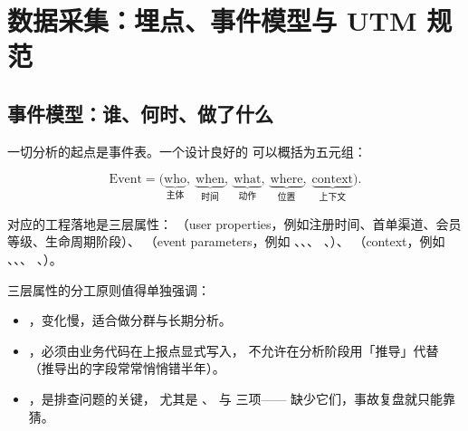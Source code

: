 \section{数据采集：埋点、事件模型与 UTM 规范}

\subsection{事件模型：谁、何时、做了什么}

一切分析的起点是事件表。一个设计良好的 可以概括为五元组：

\begin{equation}
\text{Event} = \big( \underbrace{\text{who}}_{\text{主体}}, \;
\underbrace{\text{when}}_{\text{时间}}, \;
\underbrace{\text{what}}_{\text{动作}}, \;
\underbrace{\text{where}}_{\text{位置}}, \;
\underbrace{\text{context}}_{\text{上下文}} \big).
\label{eq:growth-event-model}
\end{equation}

对应的工程落地是三层属性：
（user properties，例如注册时间、首单渠道、会员等级、生命周期阶段）、
（event parameters，例如 、、、
、）、
（context，例如 、、、
、）。

三层属性的分工原则值得单独强调：
\begin{itemize}
  \item {}，变化慢，适合做分群与长期分析。
  \item {}，必须由业务代码在上报点显式写入，
        不允许在分析阶段用「推导」代替（推导出的字段常常悄悄错半年）。
  \item {}，是排查问题的关键，
        尤其是 、 与  三项——
        缺少它们，事故复盘就只能靠猜。
\end{itemize}


